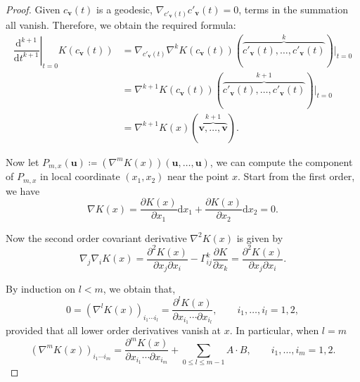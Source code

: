 \documentclass[10pt,a4paper]{amsart}
\begin{document}
\begin{proof}
	Given $c_{\bm{v}}(t)$ is a geodesic, $\nabla_{c'_{\bm{v}}(t)}c'_{\bm{v}}(t)=0$, terms in the summation all vanish. Therefore, we obtain the required formula:
	\begin{displaymath}
		\begin{aligned}
			\left.\dfrac{\mathrm{d}^{k+1}}{\mathrm{d}t^{k+1}}\right\rvert_{t=0}K(c_{\bm{v}}(t)) & =\nabla_{c'_{\bm{v}}(t)}\nabla^{k}K(c_{\bm{v}}(t))(\overbrace{c'_{\bm{v}}(t),\ldots,c'_{\bm{v}}(t)}^{k})\rvert_{t=0} \\
			                                                                                    & =\nabla^{k+1}K(c_{\bm{v}}(t))(\overbrace{c'_{\bm{v}}(t),\ldots,c'_{\bm{v}}(t)}^{k+1})\rvert_{t=0}                    \\
			                                                                                    & =\nabla^{k+1} K(x)(\overbrace{\bm{v},\ldots,\bm{v}}^{k+1}).
		\end{aligned}
	\end{displaymath}

	Now let $P_{m,x}(\bm{u})\coloneq(\nabla^{m}K(x))(\bm{u},\ldots,\bm{u})$, we can compute the component of $P_{m,x}$ in local coordinate $(x_1,x_2)$ near the point $x$. Start from the first order, we have
	\begin{displaymath}
		\nabla K(x)=\dfrac{\partial K(x)}{\partial x_{1}}\mathrm{d}x_{1} + \dfrac{\partial K(x)}{\partial x_{2}}\mathrm{d}x_2=0.
	\end{displaymath}

	Now the second order covariant derivative $\nabla^{2}K(x)$ is given by
	\begin{displaymath}
		\nabla_{j}\nabla_{i}K(x)=\dfrac{\partial^2 K(x)}{\partial x_{j}\partial x_{i}}-\Gamma^{k}_{ij}\dfrac{\partial K}{\partial x_{k}}=\dfrac{\partial^2 K(x)}{\partial x_{j}\partial x_{i}}.
	\end{displaymath}

	By induction on $l<m$, we obtain that,
	\begin{displaymath}
		0={(\nabla^{l} K(x))}_{i_{1}\cdots i_{l}}=\dfrac{\partial^{l} K(x)}{\partial x_{i_1}\cdots\partial x_{i_l}},\qquad i_1,\ldots,i_l=1,2,
	\end{displaymath}
	provided that all lower order derivatives vanish at $x$. In particular, when $l=m$
	\begin{displaymath}
		{\left(\nabla^{m} K(x)\right)}_{i_{1} \cdots i_{m}}=\dfrac{\partial^{m} K(x)}{\partial x_{i_{1}}\cdots\partial x_{i_{m}}}+\sum_{0\leq l\leq m-1} A\cdot B,\qquad i_1,\ldots,i_m=1,2.
	\end{displaymath}


\end{proof}
\end{document}
